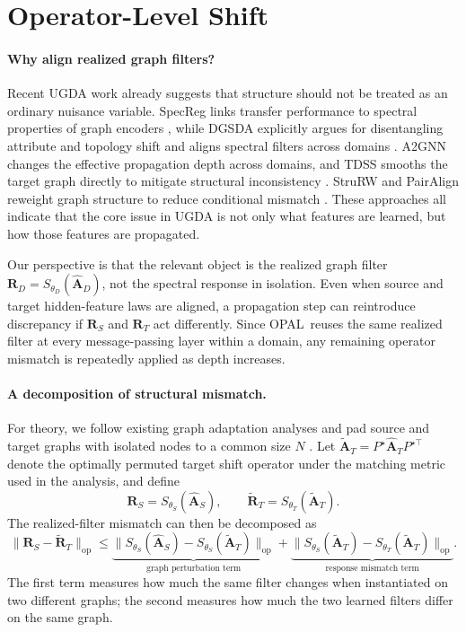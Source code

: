 \documentclass[runningheads]{llncs}
\newcommand{\model}{OPAL}
\def\mA{{\mathbf{A}}}
\def\mR{{\mathbf{R}}}
\begin{document}
\section{Operator-Level Shift}

\paragraph{Why align realized graph filters?}
Recent UGDA work already suggests that structure should not be treated as an ordinary nuisance variable. SpecReg links transfer performance to spectral properties of graph encoders \cite{specreg}, while DGSDA explicitly argues for disentangling attribute and topology shift and aligns spectral filters across domains \cite{dgsda}. A2GNN changes the effective propagation depth across domains, and TDSS smooths the target graph directly to mitigate structural inconsistency \cite{a2gnn,tdss}. StruRW and PairAlign reweight graph structure to reduce conditional mismatch \cite{stru_rw,pair_align}. These approaches all indicate that the core issue in UGDA is not only what features are learned, but how those features are propagated.

Our perspective is that the relevant object is the realized graph filter $\mR_D = S_{\theta_D}(\widehat{\mA}_D)$, not the spectral response in isolation. Even when source and target hidden-feature laws are aligned, a propagation step can reintroduce discrepancy if $\mR_S$ and $\mR_T$ act differently. Since \model\ reuses the same realized filter at every message-passing layer within a domain, any remaining operator mismatch is repeatedly applied as depth increases.

\paragraph{A decomposition of structural mismatch.}
For theory, we follow existing graph adaptation analyses and pad source and target graphs with isolated nodes to a common size $N$ \cite{ego_pad}. Let $\widetilde{\mA}_T=P^\star \widehat{\mA}_T P^{\star\top}$ denote the optimally permuted target shift operator under the matching metric used in the analysis, and define
\[
\mR_S=S_{\theta_S}(\widehat{\mA}_S), \qquad
\widetilde{\mR}_T=S_{\theta_T}(\widetilde{\mA}_T).
\]
The realized-filter mismatch can then be decomposed as
\begin{equation}
\|\mR_S-\widetilde{\mR}_T\|_{\mathrm{op}}
\le
\underbrace{\|S_{\theta_S}(\widehat{\mA}_S)-S_{\theta_S}(\widetilde{\mA}_T)\|_{\mathrm{op}}}_{\text{graph perturbation term}}
+
\underbrace{\|S_{\theta_S}(\widetilde{\mA}_T)-S_{\theta_T}(\widetilde{\mA}_T)\|_{\mathrm{op}}}_{\text{response mismatch term}}.
\label{eq:filter_gap_decomp}
\end{equation}
The first term measures how much the same filter changes when instantiated on two different graphs; the second measures how much the two learned filters differ on the same graph.
\end{document}

